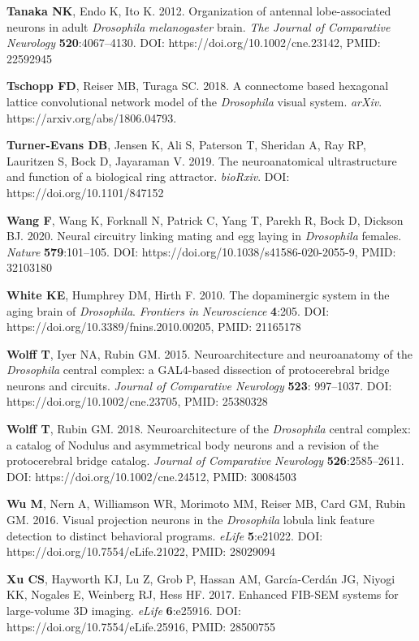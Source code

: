 \documentclass{article}
\begin{document}
\begin{hangpars}
\textbf{Tanaka NK}, Endo K, Ito K. 2012. Organization of antennal lobe-associated neurons in adult \emph{Drosophila} \emph{melanogaster} brain. \emph{The Journal of Comparative Neurology} \textbf{520}:4067–4130. DOI: https://doi.org/10.1002/cne.23142, PMID: 22592945

\textbf{Tschopp FD}, Reiser MB, Turaga SC. 2018. A connectome based hexagonal lattice convolutional network model of the \emph{Drosophila} visual system. \emph{arXiv}. https://arxiv.org/abs/1806.04793.

\textbf{Turner-Evans DB}, Jensen K, Ali S, Paterson T, Sheridan A, Ray RP, Lauritzen S, Bock D, Jayaraman V. 2019. The neuroanatomical ultrastructure and function of a biological ring attractor. \emph{bioRxiv}. DOI: https://doi.org/10.1101/847152

\textbf{Wang F}, Wang K, Forknall N, Patrick C, Yang T, Parekh R, Bock D, Dickson BJ. 2020. Neural circuitry linking mating and egg laying in \emph{Drosophila} females. \emph{Nature} \textbf{579}:101–105. DOI: https://doi.org/10.1038/s41586-020-2055-9, PMID: 32103180

\textbf{White KE}, Humphrey DM, Hirth F. 2010. The dopaminergic system in the aging brain of \emph{Drosophila}. \emph{Frontiers in} \emph{Neuroscience} \textbf{4}:205. DOI: https://doi.org/10.3389/fnins.2010.00205, PMID: 21165178

\textbf{Wolff T}, Iyer NA, Rubin GM. 2015. Neuroarchitecture and neuroanatomy of the \emph{Drosophila} central complex: a GAL4-based dissection of protocerebral bridge neurons and circuits. \emph{Journal of Comparative Neurology} \textbf{523}: 997–1037. DOI: https://doi.org/10.1002/cne.23705, PMID: 25380328

\textbf{Wolff T}, Rubin GM. 2018. Neuroarchitecture of the \emph{Drosophila} central complex: a catalog of Nodulus and asymmetrical body neurons and a revision of the protocerebral bridge catalog. \emph{Journal of Comparative} \emph{Neurology} \textbf{526}:2585–2611. DOI: https://doi.org/10.1002/cne.24512, PMID: 30084503

\textbf{Wu M}, Nern A, Williamson WR, Morimoto MM, Reiser MB, Card GM, Rubin GM. 2016. Visual projection neurons in the \emph{Drosophila} lobula link feature detection to distinct behavioral programs. \emph{eLife} \textbf{5}:e21022. DOI: https://doi.org/10.7554/eLife.21022, PMID: 28029094

\textbf{Xu CS}, Hayworth KJ, Lu Z, Grob P, Hassan AM, García-Cerdán JG, Niyogi KK, Nogales E, Weinberg RJ, Hess HF. 2017. Enhanced FIB-SEM systems for large-volume 3D imaging. \emph{eLife} \textbf{6}:e25916. DOI: https://doi.org/10.7554/eLife.25916, PMID: 28500755


\end{hangpars}
\end{document}

